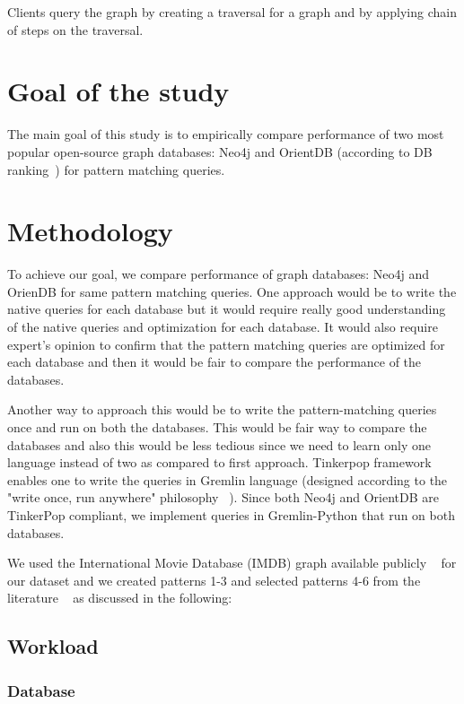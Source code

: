 Clients query the graph by creating a traversal for a graph and by applying chain of steps on the traversal.

\section{Goal of the study}

The main goal of this study is to empirically compare performance of two most popular open-source graph databases: Neo4j and OrientDB (according to DB ranking~\cite{dbranking}) for pattern matching queries.

\section{Methodology}

To achieve our goal, we compare performance of graph databases: Neo4j and OrienDB for same pattern matching queries. One approach would be to write the native queries for each database but it would require really good understanding of the native queries and optimization for each database. It would also require expert's opinion to confirm that the pattern matching queries are optimized for each database and then it would be fair to compare the performance of the databases.

Another way to approach this would be to write the pattern-matching queries once and run on both the databases. This would be fair way to compare the databases and also this would be less tedious since we need to learn only one language instead of two as compared to first approach. Tinkerpop framework enables one to write the queries in Gremlin language (designed according to the "write once, run anywhere" philosophy ~\cite{gremlin}). Since both Neo4j and OrientDB are TinkerPop compliant, we implement queries in Gremlin-Python that run on both databases. 

We used the International Movie Database (IMDB) graph available publicly ~\cite{IMDb96:online} for our dataset and  we created patterns 1-3 and selected patterns 4-6 from the literature ~\cite{tripoulthere} as discussed in the following:  

\subsection{Workload}

\subsubsection{Database}

